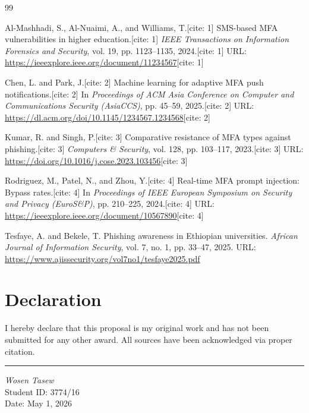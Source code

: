 \documentclass[11pt]{article}
\begin{document}
\begin{thebibliography}{99}

Al-Mashhadi, S., Al-Nuaimi, A., and Williams, T.[cite: 1]
\newblock SMS-based MFA vulnerabilities in higher education.[cite: 1]
\newblock \textit{IEEE Transactions on Information Forensics and Security}, vol. 19, pp. 1123--1135, 2024.[cite: 1]
\newblock URL: \url{https://ieeexplore.ieee.org/document/11234567}[cite: 1]

Chen, L. and Park, J.[cite: 2]
\newblock Machine learning for adaptive MFA push notifications.[cite: 2]
\newblock In \textit{Proceedings of ACM Asia Conference on Computer and Communications Security (AsiaCCS)}, pp. 45--59, 2025.[cite: 2]
\newblock URL: \url{https://dl.acm.org/doi/10.1145/1234567.1234568}[cite: 2]

Kumar, R. and Singh, P.[cite: 3]
\newblock Comparative resistance of MFA types against phishing.[cite: 3]
\newblock \textit{Computers \& Security}, vol. 128, pp. 103--117, 2023.[cite: 3]
\newblock URL: \url{https://doi.org/10.1016/j.cose.2023.103456}[cite: 3]

Rodriguez, M., Patel, N., and Zhou, Y.[cite: 4]
\newblock Real-time MFA prompt injection: Bypass rates.[cite: 4]
\newblock In \textit{Proceedings of IEEE European Symposium on Security and Privacy (EuroS\&P)}, pp. 210--225, 2024.[cite: 4]
\newblock URL: \url{https://ieeexplore.ieee.org/document/10567890}[cite: 4]

Tesfaye, A. and Bekele, T.
\newblock Phishing awareness in Ethiopian universities.
\newblock \textit{African Journal of Information Security}, vol. 7, no. 1, pp. 33--47, 2025.
\newblock URL: \url{https://www.ajissecurity.org/vol7no1/tesfaye2025.pdf}

\end{thebibliography}

\section*{Declaration}
I hereby declare that this proposal is my original work and has not been submitted for any other award. All sources have been acknowledged via proper citation.

\vspace{1cm}
\hrule
\vspace{0.3cm}
\textit{Wosen Tasew} \\
Student ID: 3774/16 \\
Date: May 1, 2026
\end{document}
